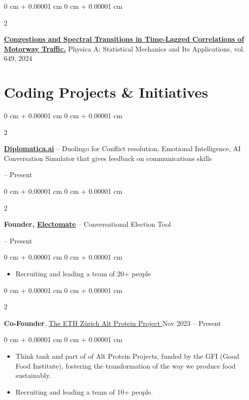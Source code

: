 \documentclass[10pt, letterpaper]{article}
\newenvironment{highlights}{
    \begin{itemize}[
        topsep=0.10 cm,
        parsep=0.10 cm,
        partopsep=0pt,
        itemsep=0pt,
        leftmargin=0 cm + 10pt
    ]
}{
    \end{itemize}
}
\newenvironment{onecolentry}{
    \begin{adjustwidth}{
        0 cm + 0.00001 cm
    }{
        0 cm + 0.00001 cm
    }
}{
    \end{adjustwidth}
}
\newenvironment{twocolentry}[2][]{
    \onecolentry
    \def\secondColumn{#2}
    \setcolumnwidth{\fill, 4.5 cm}
    \begin{paracol}{2}
}{
    \switchcolumn \raggedleft \secondColumn
    \end{paracol}
    \endonecolentry
}
\begin{document}
        \vspace{0.2 cm}

        \begin{twocolentry}{
            2024 
        }
            \href{https://www.sciencedirect.com/science/article/pii/S0378437124004618?via%3Dihub}{\textbf{Congestions and Spectral Transitions in Time-Lagged Correlations of Motorway Traffic.}} Physica A: Statistical Mechanics and Its Applications, vol. 649, 2024\end{twocolentry}

        \vspace{0.2 cm}

    \section{Coding Projects \& Initiatives }

        \begin{twocolentry}{
            2024 – Present
        }
            \href{https://diplomatica.ai/}{\textbf{\underline{Diplomatica.ai}}} – Duolingo for Conflict resolution, Emotional Intelligence, AI Conversation Simulator that gives feedback on communications skills
        \end{twocolentry}

        \vspace{0.2 cm}

        \begin{twocolentry}{
            2024 – Present
        }
            \textbf{Founder, \href{https://electomate.com/}{\underline{Electomate}}} – Conversational Election Tool
        \end{twocolentry}

        \vspace{0.10 cm}
        \begin{onecolentry}
            \begin{highlights}
                \item Recruiting and leading a team of 20+ people
            \end{highlights}
        \end{onecolentry}

        \begin{twocolentry}{
            Nov 2023 – Present
        }
            \textbf{Co-Founder}, \href{https://ethzurichaltpro.wordpress.com/}{\underline{The ETH Zürich Alt Protein Project }}\end{twocolentry}

        \vspace{0.10 cm}
        \begin{onecolentry}
            \begin{highlights}
                \item Think tank and part of of Alt Protein Projects, funded by the GFI (Good Food Institute), fostering the transformation of the way we produce food sustainably.
                \item Recruiting and leading a team of 10+ people.
            \end{highlights}
        \end{onecolentry}
\end{document}
